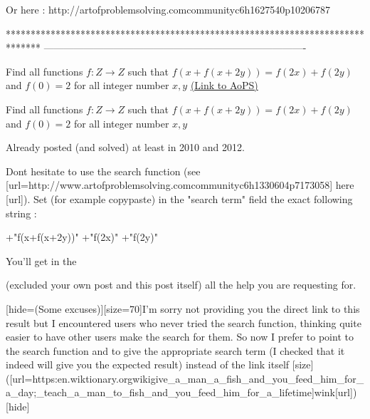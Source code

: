 \begin{solution}
	Or here : http://artofproblemsolving.com\/community\/c6h1627540p10206787

\end{solution}
*******************************************************************************
-------------------------------------------------------------------------------

\begin{problem}
	Find all  functions  $f:Z\longrightarrow Z $ such that $f (x+f(x+2y))=f (2x)+f (2y) $ and $f(0)=2$ for all integer number $x,y $
	\flushright \href{https://artofproblemsolving.com/community/c6h1628333}{(Link to AoPS)}
\end{problem}



\begin{solution}
	\begin{tcolorbox}Find all  functions  $f:Z\longrightarrow Z $ such that $f (x+f(x+2y))=f (2x)+f (2y) $ and $f(0)=2$ for all integer number $x,y $\end{tcolorbox}
Already posted (and solved) at least in 2010 and 2012.

Dont hesitate to use the search function (see [url=http://www.artofproblemsolving.com\/community\/c6h1330604p7173058] here [\/url]).
Set (for example copy\/paste) in the "search term" field the exact following string : 

+"f(x+f(x+2y))" +"f(2x)" +"f(2y)"

You'll get in the  (excluded your own post and this post itself) all the help you are requesting for.

[hide=(Some excuses)][size=70]I'm sorry not providing you the direct link to this result but I encountered users who never tried the search function, thinking quite easier to have other users make the search for them. So now I prefer to point to the search function and to give the appropriate search term (I checked that it indeed will give you the expected result) instead of the link itself [\/size]([url=https:\/\/en.wiktionary.org\/wiki\/give_a_man_a_fish_and_you_feed_him_for_a_day;_teach_a_man_to_fish_and_you_feed_him_for_a_lifetime]wink[\/url])[\/hide]



\end{solution}



